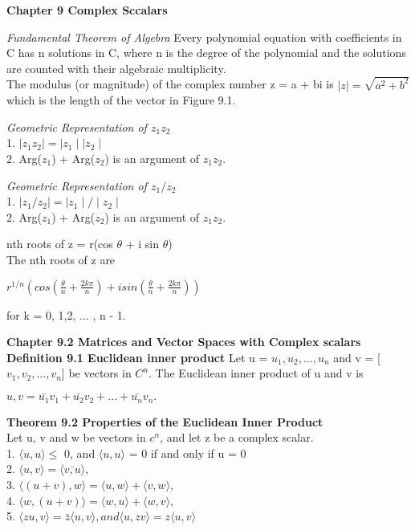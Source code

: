 \documentclass {article}
\begin{document}
\textbf {Chapter 9 Complex Sccalars}

\textit {Fundamental Theorem of Algebra} Every polynomial equation with coefficients in C has n solutions in C, where n is the degree of the polynomial and the solutions are counted with their algebraic multiplicity.
\\

The modulus (or magnitude) of the complex number z = a + bi is $\mid z \mid = \sqrt{a^2 + b^2}$ which is the length of the vector in Figure 9.1.

\textit { Geometric Representation of $z_1 z_2$ }
\\
1. $ \mid z_1 z_2 \mid = \mid z_1 \mid \mid z_2 \mid$
\\
2. Arg($z_1$) + Arg($z_2$) is an argument of $z_1 z_2$.

\textit { Geometric Representation of $z_1 / z_2$ }
\\
1. $ \mid z_1 / z_2 \mid = \mid z_1 \mid / \mid z_2 \mid$
\\
2. Arg($z_1$) + Arg($z_2$) is an argument of $z_1 z_2$.

nth roots of z = r(cos $\theta$ + i sin $\theta$) \\
The nth roots of z are

\begin{center}
$ r^{1/n} (cos( {\frac{\theta} {n}} + {\frac {2k\pi} {n}} ) + i sin( \frac{\theta} {n} + \frac {2k\pi}{n}))$
\end{center}

for k = 0, 1,2, ... , n - 1.

\textbf { Chapter 9.2 Matrices and Vector Spaces with Complex scalars }
\textbf {Definition 9.1 Euclidean inner product} Let u = {$u_1 , {u_2} ,..., {u_n}$} and v = [${v_1}, {v_2}, ... , {v_n}$] be vectors in $C^n$. The Euclidean inner product of u and v is 
\begin{center}
$ u, v = \bar{u_1} v_1 + \bar{u_2} v_2 + ... + \bar {u_n} v_n.$
\end{center}

\textbf {Theorem 9.2 Properties of the Euclidean Inner Product} \\
Let u, v and w be vectors in $c^n$, and let z be a complex scalar. \\

1. $\langle u, u \rangle \leq$ 0, and $\langle u , u \rangle$ = 0 if and only if u = 0 \\

2. $\langle u, v \rangle  = {\langle \bar{v, u} \rangle}$,
\\
3. $\langle (u + v), w \rangle = {\langle u, w \rangle} + \langle v, w \rangle , $
\\
4. $\langle w, (u + v) \rangle = {\langle w, u \rangle} + {\langle w, v \rangle},$
\\
5. $\langle zu , v \rangle = \bar{z} \langle u, v \rangle, and \langle u, zv \rangle = z \langle u, v \rangle $
\end{document}
